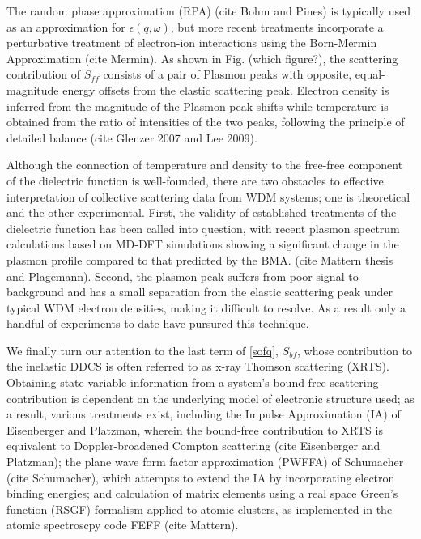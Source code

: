 \documentclass [11pt, proquest, article] {uwthesis}[2016/11/22]
\begin{document}
The random phase approximation (RPA) (cite Bohm and Pines) is typically used as an approximation for $\epsilon(q, \omega)$, but more recent treatments incorporate a perturbative treatment of electron-ion interactions using the Born-Mermin Approximation (cite Mermin). As shown in Fig. (which figure?), the scattering contribution of $S_{ff}$ consists of a pair of Plasmon peaks with opposite, equal-magnitude energy offsets from the elastic scattering peak. Electron density is inferred from the magnitude of the Plasmon peak shifts while temperature is obtained from the ratio of intensities of the two peaks, following the principle of detailed balance (cite Glenzer 2007 and Lee 2009).

Although the connection of temperature and density to the free-free component of the dielectric function is well-founded, there are two obstacles to effective interpretation of collective scattering data from WDM systems; one is theoretical and the other experimental. First, the validity of established treatments of the dielectric function has been called into question, with recent plasmon spectrum calculations based on MD-DFT simulations showing a significant change in the plasmon profile compared to that predicted by the BMA. (cite Mattern thesis and Plagemann). Second, the plasmon peak suffers from poor signal to background and has a small separation from the elastic scattering peak under typical WDM electron densities, making it difficult to resolve. As a result only a handful of experiments to date have pursured this technique. 

We finally turn our attention to the last term of \ref{sofq}, $S_{bf}$, whose contribution to the inelastic DDCS is often referred to as x-ray Thomson scattering (XRTS). Obtaining state variable information from a system's bound-free scattering contribution is dependent on the underlying model of electronic structure used; as a result, various treatments exist, including the Impulse Approximation (IA) of Eisenberger and Platzman, wherein the bound-free contribution to XRTS is equivalent to Doppler-broadened Compton scattering (cite Eisenberger and Platzman); the plane wave form factor approximation (PWFFA) of Schumacher (cite Schumacher), which attempts to extend the IA by incorporating electron binding energies; and calculation of matrix elements using a real space Green's function (RSGF) formalism applied to atomic clusters, as implemented in the atomic spectroscpy code FEFF (cite Mattern).
\end{document}
